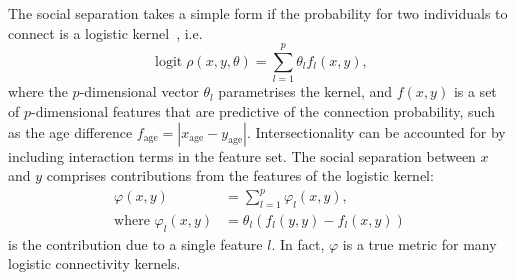 \documentclass{scrartcl}
\DeclareMathOperator{\logit}{logit}
\newcommand{\abs}[1]{\left|#1\right|}
\begin{document}
\begin{refsection}
The social separation takes a simple form if the probability for two individuals to connect is a logistic kernel~\cite{Hoff2002}, i.e.\
\begin{equation}
    \logit\rho(x, y, \theta) = \sum_{l=1}^p\theta_l f_l(x,y),\label{eq:logistic-kernel}
\end{equation}
where the $p$-dimensional vector $\theta_l$ parametrises the kernel, and $f(x, y)$ is a set of $p$-dimensional features that are predictive of the connection probability, such as the age difference $f_\text{age}=\abs{x_\mathrm{age}-y_\mathrm{age}}$. Intersectionality can be accounted for by including interaction terms in the feature set. The social separation between $x$ and $y$ comprises contributions from the features of the logistic kernel:
\begin{align}
    \varphi(x,y) &= \sum_{l=1}^p\varphi_l(x, y),\label{eq:social-separation-logistic}\\
    \text{where }\varphi_l(x, y) &= \theta_l\left(f_l(y, y) - f_l(x, y)\right)\label{eq:social-separation-contribution}
\end{align}
is the contribution due to a single feature $l$. In fact, $\varphi$ is a true metric for many logistic connectivity kernels.


\end{refsection}
\end{document}
